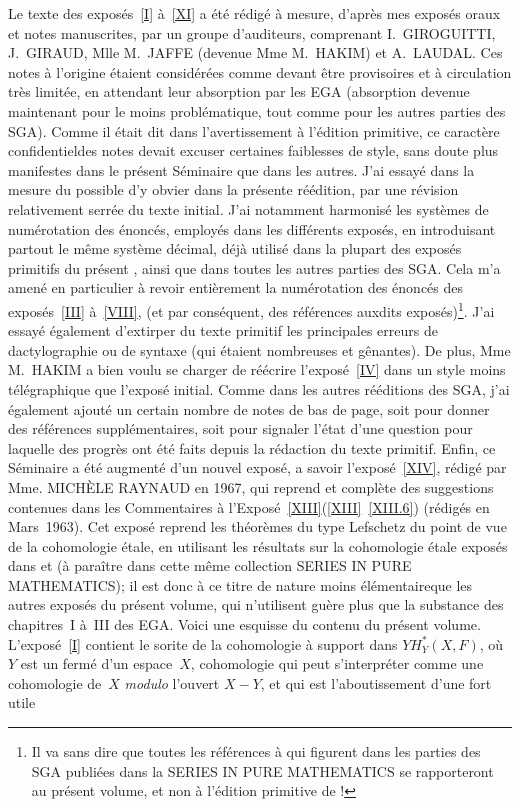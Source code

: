 Le texte des expos\'es~\ref{I} \`a~\ref{XI} a \'et\'e r\'edig\'e \`a mesure, d'apr\`es mes expos\'es oraux et notes manuscrites, par un groupe d'auditeurs, comprenant I.\, GIROGUITTI, J.\, GIRAUD, Mlle M.\, JAFFE (devenue Mme M.\, HAKIM) et A.\, LAUDAL. Ces notes \`a l'origine \'etaient consid\'er\'ees comme devant \^etre provisoires et \`a circulation tr\`es limit\'ee, en attendant leur absorption par les EGA (absorption devenue maintenant pour le moins probl\'ematique, tout comme pour les autres parties des SGA). Comme il \'etait dit dans l'avertissement \`a l'\'edition primitive, ce caract\`ere \og confidentiel\fg des notes devait excuser certaines \og faiblesses de style\fg, sans doute plus manifestes dans le pr\'esent S\'eminaire  que dans les autres. J'ai essay\'e dans la mesure du possible d'y obvier dans la pr\'esente r\'e\'edition, par une r\'evision relativement serr\'ee du texte initial. J'ai notamment harmonis\'e les syst\`emes de num\'erotation des \'enonc\'es, employ\'es dans les diff\'erents expos\'es, en introduisant partout le m\^eme syst\`eme d\'ecimal, d\'ej\`a utilis\'e dans la plupart des expos\'es primitifs du pr\'esent , ainsi que dans toutes les autres parties des SGA. Cela m'a amen\'e en particulier \`a revoir enti\`erement la num\'erotation des \'enonc\'es des expos\'es~\ref{III} \`a~\ref{VIII}, (et par cons\'equent, des r\'ef\'erences auxdits expos\'es)\footnote{Il va sans dire que toutes les r\'ef\'erences \`a  qui figurent dans les parties des SGA publi\'ees dans la SERIES IN PURE MATHEMATICS se rapporteront au pr\'esent volume, et non \`a l'\'edition primitive de  !}. J'ai essay\'e \'egalement d'extirper du texte primitif les principales erreurs de dactylographie ou de syntaxe (qui \'etaient nombreuses et g\^enantes). De plus, Mme M.\, HAKIM a bien voulu se charger de r\'e\'ecrire l'expos\'e~\ref{IV} dans un style moins t\'el\'egraphique que l'expos\'e initial. Comme dans les autres r\'e\'editions des SGA, j'ai \'egalement ajout\'e un certain nombre de notes de bas de page, soit pour donner des r\'ef\'erences suppl\'ementaires, soit pour signaler l'\'etat d'une question pour laquelle des progr\`es ont \'et\'e faits depuis la r\'edaction du texte primitif. Enfin, ce S\'eminaire a \'et\'e augment\'e d'un nouvel expos\'e, a savoir l'expos\'e~\ref{XIV}, r\'edig\'e par Mme. MICH\`ELE RAYNAUD en 1967, qui reprend et compl\`ete des suggestions contenues dans les \og Commentaires \`a l'Expos\'e~\ref{XIII}\fg (\ref{XIII}~\ref{XIII.6}) (r\'edig\'es en Mars~1963). Cet expos\'e reprend les th\'eor\`emes du type Lefschetz du point de vue de la cohomologie \'etale, en utilisant les r\'esultats sur la cohomologie \'etale expos\'es dans  et  (\`a para\^itre dans cette m\^eme collection SERIES IN PURE MATHEMATICS); il est donc \`a ce titre de nature moins \og \'el\'ementaire\fg que les autres expos\'es du pr\'esent volume, qui n'utilisent gu\`ere plus que la substance des chapitres~I \`a~III des EGA. Voici une esquisse du contenu du pr\'esent volume. L'expos\'e~\ref{I} contient le sorite de la \og cohomologie \`a support dans $Y$\fg $H^*_Y(X, F)$, o\`u $Y$ est un ferm\'e d'un espace~$X$, cohomologie qui peut s'interpr\'eter comme une cohomologie de~$X$ \emph{modulo} l'ouvert $X-Y$, et qui est l'aboutissement d'une fort utile 